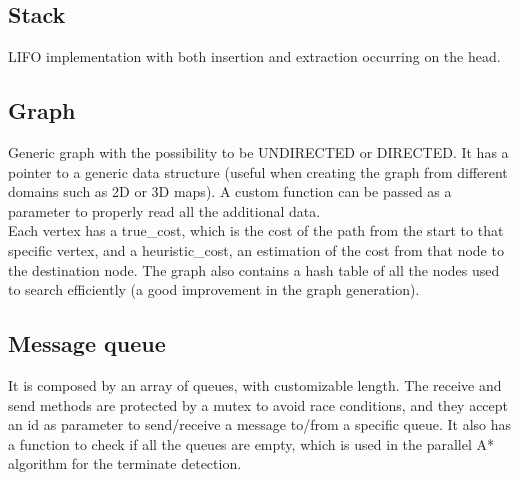 \subsection{Stack}
\label{stack}

LIFO implementation with both insertion and extraction occurring on the head.

\subsection{Graph}

Generic graph with the possibility to be UNDIRECTED or DIRECTED. It has a pointer to a generic data structure (useful when creating the graph from different domains such as 2D or 3D maps). A custom function can be passed as a parameter to properly read all the additional data. \\
Each vertex has a true\_cost, which is the cost of the path from the start to that specific vertex, and a heuristic\_cost, an estimation of the cost from that node to the destination node.
The graph also contains a hash table of all the nodes used to search efficiently (a good improvement in the graph generation).

\subsection{Message queue}
\label{message_queue}

It is composed by an array of queues, with customizable length.
The receive and send methods are protected by a mutex to avoid race conditions, and they accept an id as parameter to send/receive a message to/from a specific queue. 
It also has a function to check if all the queues are empty, which is used in the parallel A* algorithm for the terminate detection.
